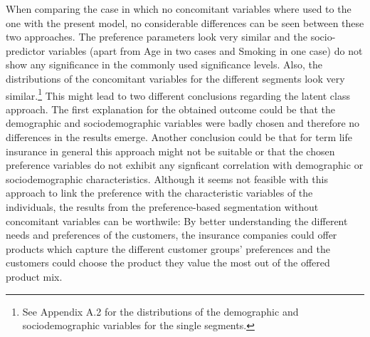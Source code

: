 \documentclass[12pt, abstracton]{article}
\begin{document}
When comparing the case in which no concomitant variables where used to the one with the present model, no considerable differences can be seen between these two approaches. The preference parameters look very similar and the socio-predictor variables (apart from Age in two cases and Smoking in one case) do not show any significance in the commonly used significance levels. Also, the distributions of the concomitant variables for the different segments look very similar.\footnote{See Appendix A.2 for the distributions of the demographic and sociodemographic variables for the single segments.} This might lead to two different conclusions regarding the latent class approach. The first explanation for the obtained outcome could be that the demographic and sociodemographic variables were badly chosen and therefore no differences in the results emerge. Another conclusion could be that for term life insurance in general this approach might not be suitable or that the chosen preference variables do not exhibit any signficant correlation with demographic or sociodemographic characteristics. Although it seems not feasible with this approach to link the preference with the characteristic variables of the individuals, the results from the preference-based segmentation without concomitant variables can be worthwile: By better understanding the different needs and preferences of the customers, the insurance companies could offer products which capture the different customer groups' preferences and the customers could choose the product they value the most out of the offered product mix.
\end{document}
